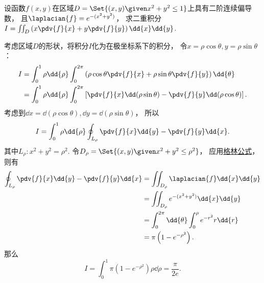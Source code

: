 \begin{example}
设函数\(f(x,y)\)在区域\(D=\Set{(x,y) \given x^2+y^2\leq1}\)上具有二阶连续偏导数，
且\(\laplacian{f}=e^{-(x^2+y^2)}\)，
求二重积分\(I=\iint_D\left(x\pdv{f}{x}+y\pdv{f}{y}\right)\dd{x}\dd{y}\).
\begin{solution}
考虑区域\(D\)的形状，将积分\(I\)化为在极坐标系下的积分，
令\(x=\rho\cos\theta, y=\rho\sin\theta\)：
\begin{align*}
	I &= \int_0^1 \rho\dd{\rho} \int_0^{2\pi}
		\left(\rho\cos\theta\pdv{f}{x}+\rho\sin\theta\pdv{f}{y}\right) \dd{\theta} \\
	&= \int_0^1 \rho\dd{\rho} \int_0^{2\pi}
		\left[\pdv{f}{x}\dd(\rho\sin\theta)-\pdv{f}{y}\dd(\rho\cos\theta)\right].
\end{align*}
考虑到\(\dd{x}=\dd(\rho\cos\theta),
\dd{y}=\dd(\rho\sin\theta)\)，
所以\begin{equation*}
	I = \int_0^1 \rho\dd{\rho} \oint_{L_\rho} \pdv{f}{x}\dd{y}-\pdv{f}{y}\dd{x}.
\end{equation*}
其中\(L_\rho: x^2+y^2=\rho^2\).
令\(D_\rho = \Set{ (x,y) \given x^2+y^2\leq\rho^2 }\)，
应用\hyperref[equation:线积分与面积分.格林公式]{格林公式}，
则有\begin{align*}
	\oint_{L_\rho} \pdv{f}{x}\dd{y}-\pdv{f}{y}\dd{x}
	&= \iint_{D_\rho} \laplacian{f} \dd{x}\dd{y} \\
	&= \iint_{D_\rho} e^{-(x^2+y^2)} \dd{x}\dd{y} \\
	&= \int_0^{2\pi} \dd{\theta} \int_0^\rho e^{-r^2} r\dd{r} \\
	&= \pi \left(1-e^{-\rho^2}\right).
\end{align*}
那么\begin{equation*}
	I = \int_0^1 \pi \left(1-e^{-\rho^2}\right) \rho\dd{\rho}
	=  \frac{\pi}{2e}.
\end{equation*}
\end{solution}
\end{example}


